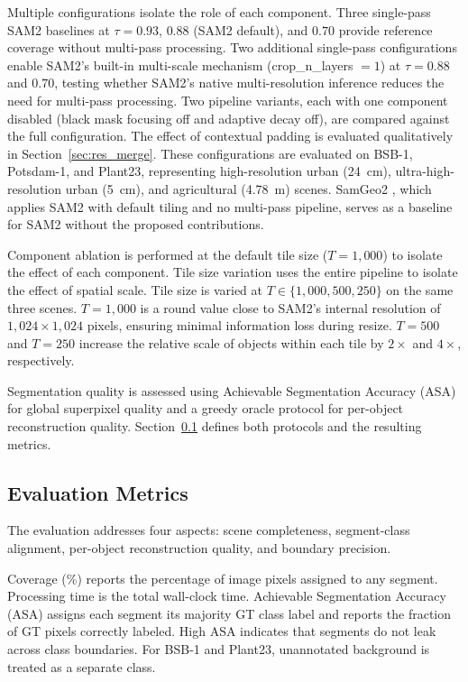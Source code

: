 \documentclass[review,11pt,authoryear]{elsarticle}
\begin{document}
Multiple configurations isolate the role of each component. Three single-pass SAM2 baselines at $\tau = 0.93$, $0.88$ (SAM2 default), and $0.70$ provide reference coverage without multi-pass processing. Two additional single-pass configurations enable SAM2's built-in multi-scale mechanism (crop\_n\_layers $= 1$) at $\tau = 0.88$ and $0.70$, testing whether SAM2's native multi-resolution inference reduces the need for multi-pass processing. Two pipeline variants, each with one component disabled (black mask focusing off and adaptive decay off), are compared against the full configuration. The effect of contextual padding is evaluated qualitatively in Section~\ref{sec:res_merge}. These configurations are evaluated on BSB-1, Potsdam-1, and Plant23, representing high-resolution urban (24~cm), ultra-high-resolution urban (5~cm), and agricultural (4.78~m) scenes. SamGeo2 \citep{wu2023samgeo}, which applies SAM2 with default tiling and no multi-pass pipeline, serves as a baseline for SAM2 without the proposed contributions.

Component ablation is performed at the default tile size ($T = 1{,}000$) to isolate the effect of each component. Tile size variation uses the entire pipeline to isolate the effect of spatial scale. Tile size is varied at $T \in \{1{,}000, 500, 250\}$ on the same three scenes. $T = 1{,}000$ is a round value close to SAM2's internal resolution of $1{,}024 \times 1{,}024$ pixels, ensuring minimal information loss during resize. $T = 500$ and $T = 250$ increase the relative scale of objects within each tile by $2\times$ and $4\times$, respectively.

Segmentation quality is assessed using Achievable Segmentation Accuracy (ASA) for global superpixel quality and a greedy oracle protocol for per-object reconstruction quality. Section~\ref{sec:exp_metrics} defines both protocols and the resulting metrics.

\subsection{Evaluation Metrics}
\label{sec:exp_metrics}

The evaluation addresses four aspects: scene completeness, segment-class alignment, per-object reconstruction quality, and boundary precision.

Coverage (\%) reports the percentage of image pixels assigned to any segment. Processing time is the total wall-clock time. Achievable Segmentation Accuracy (ASA) \citep{stutz2018superpixels} assigns each segment its majority GT class label and reports the fraction of GT pixels correctly labeled. High ASA indicates that segments do not leak across class boundaries. For BSB-1 and Plant23, unannotated background is treated as a separate class.
\end{document}
